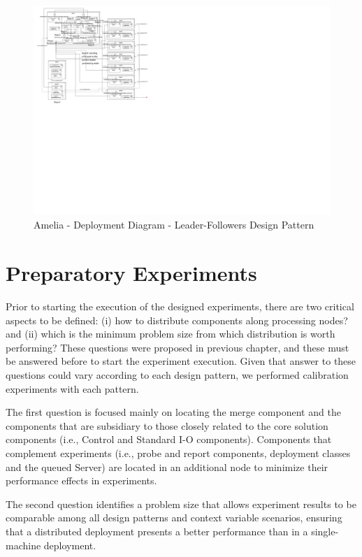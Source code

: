 \begin{figure}[p!]
	\centering
	\includegraphics[trim=5cm 45cm -5cm 4cm, scale=0.45]{fig/JCMunozLeader-Followers.pdf}
	\caption{Amelia - Deployment Diagram - Leader-Followers Design Pattern}
	\label{fig:diagramJCMunozLeader-Followers}
\end{figure}

\section{Preparatory Experiments}
\label{sec:prepExperiments}
Prior to starting the execution of the designed experiments, there are two critical aspects to be defined: (i) how to distribute components along processing nodes? and (ii) which is the minimum problem size from which distribution is worth performing? These questions were proposed in previous chapter, and these must be answered before to start the experiment execution. Given that answer to these questions could vary according to each design pattern, we performed calibration experiments with each pattern.

The first question is focused mainly on locating the merge component and the components that are subsidiary to those closely related to the core solution components (i.e., Control and Standard I-O components). Components that complement experiments (i.e., probe and report components, deployment classes and the queued Server) are located in an additional node to minimize their performance effects in experiments.

The second question identifies a problem size that allows experiment results to be comparable among all design patterns and context variable scenarios, ensuring that a distributed deployment presents a better performance than in a single-machine deployment.

